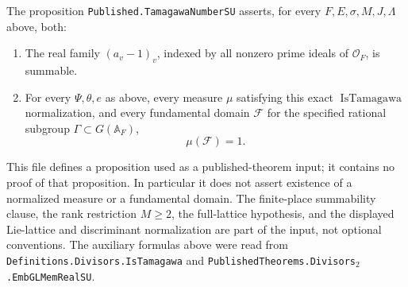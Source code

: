 \begin{definition}
The proposition \texttt{Published.TamagawaNumberSU} asserts,
for every $F,E,\sigma,M,J,\Lambda$ above, both:
\begin{enumerate}
\item The real family $(a_v-1)_v$, indexed by all nonzero prime
ideals of $\mathcal O_F$, is summable.
\item For every $\Psi,\theta,e$ as above, every measure $\mu$
satisfying this exact $\operatorname{IsTamagawa}$ normalization,
and every fundamental domain $\mathcal F$ for the specified
rational subgroup $\Gamma\subset G(\mathbb A_F)$,
\[
                              \mu(\mathcal F)=1.
\]
\end{enumerate}
\end{definition}

\begin{remark}
This file defines a proposition used as a published-theorem input;
it contains no proof of that proposition. In particular it does not
assert existence of a normalized measure or a fundamental domain.
The finite-place summability clause, the rank restriction $M\ge2$,
the full-lattice hypothesis, and the displayed Lie-lattice and
discriminant normalization are part of the input, not optional
conventions. The auxiliary formulas above were read from
\texttt{Definitions.Divisors.IsTamagawa} and
\texttt{PublishedTheorems.Divisors$_2$.EmbGLMemRealSU}.
\end{remark}

